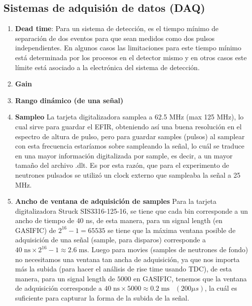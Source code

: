 \subsection{Sistemas de adquisión de datos (DAQ)}

\begin{enumerate}
\item \textbf{Dead time}: Para un sistema de detección, es el tiempo mínimo de separación de dos eventos para que sean medidos como dos pulsos independientes. En algunos casos las limitaciones para este tiempo mínimo está determinada por los procesos en el detector mismo y en otros casos este límite está asociado a la electrónica del sistema de detección.

\item \textbf{Gain}

\item \textbf{Rango dinámico (de una señal)}

\item \textbf{Sampleo} La tarjeta digitalizadora samplea a 62.5 MHz (max 125 MHz), lo cual sirve para guardar el EFIR, obteniendo así una buena resolución en el espectro de altura de pulso, pero para guardar samples (pulsos) al samplear con esta frecuencia estaríamos sobre sampleando la señal, lo cuál se traduce en una mayor información digitalizada por sample, es decir, a un mayor tamaño del archivo .dlt. Es por esta razón, que para el experimento de neutrones pulsados se utilizó un clock externo que sampleaba la señal a 25 MHz.

\item \textbf{Ancho de ventana de adquisición de samples} Para la tarjeta digitalizadora Struck SIS3316-125-16, se tiene que cada bin corresponde a un ancho de tiempo de 40 ns, de esta manera, para un signal length (en GASIFIC) de $2^{16}-1=65535$ se tiene que la máxima ventana posible de adquisición de una señal (sample, para disparos) corresponde a $40 \phantom{!} \text{ns} \times 2^{16}-1  \approx 2.6 \phantom{!} \text{ms} $. Luego para movies (samples de neutrones de fondo) no necesitamos una ventana tan ancha de adquisición, ya que nos importa más la subida (para hacer el análisis de rise time usando TDC), de esta manera, para un signal length de $5000$ en GASIFIC, tenemos que la ventana de adquisición corresponde a $40 \phantom{!} \text{ns} \times 5000  \approx 0.2 \phantom{!} \text{ms} \phantom{@} (200 \mu s) $, la cuál es suficiente para capturar la forma de la subida de la señal.
\end{enumerate}


